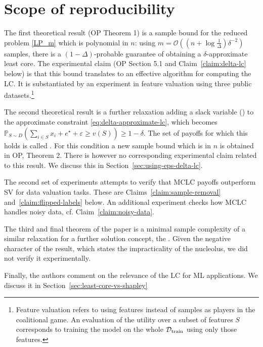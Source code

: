 \section{Scope of reproducibility}\label{sec:claims}

The first theoretical result (OP Theorem 1) is a sample bound for the reduced
problem \eqref{LP_m} which is polynomial in $n$: using $m =\mathcal{O} \left(
\left( n + \log \frac{1}{\Delta} \right) \delta^{- 2} \right)$ samples, there
is a $(1 - \Delta)$-probable guarantee of obtaining a $\delta$-approximate
least core. The experimental claim (OP Section 5.1 and
Claim~\ref{claim:delta-lc} below) is that this bound translates to an
effective algorithm for computing the LC. It is substantiated by an experiment
in feature valuation using three public datasets.\footnote{Feature valuation
refers to using features instead of samples as players in the coalitional
game. An evaluation of the utility over a subset of features $S$ corresponds
to training the model on the whole $\mathcal{D}_{\operatorname{train}}$ using only
those features.}

The second theoretical result is a further relaxation adding a slack variable
({}) to the approximate constraint
\eqref{eq:delta-approximate-lc}, which becomes $\mathbb{P}_{S \sim D} \left(
\sum_{i \in S} x_i + e^{\star} + \varepsilon \geqslant v (S) \right) \geqslant
1 - \delta$. The set of payoffs for which this holds is called
{}. For this
condition a new sample bound which is {} in $n$ is obtained
in OP, Theorem 2. There is however no corresponding experimental claim related
to this result. We discuss this in Section~\ref{sec:using-eps-delta-lc}.

The second set of experiments attempts to verify that MCLC payoffs outperform
SV for data valuation tasks. These are Claims~\ref{claim:sample-removal}
and~\ref{claim:flipped-labels} below. An additional experiment checks how MCLC
handles noisy data, cf. Claim~\ref{claim:noisy-data}.

The third and final theorem of the paper is a minimal sample complexity of a
similar relaxation for a further solution concept, the .
Given the negative character of the result, which states the impracticality of
the nucleolus, we did not verify it experimentally.

Finally, the authors comment on the relevance of the LC for ML applications.
We discuss it in Section~\ref{sec:least-core-vs-shapley}

